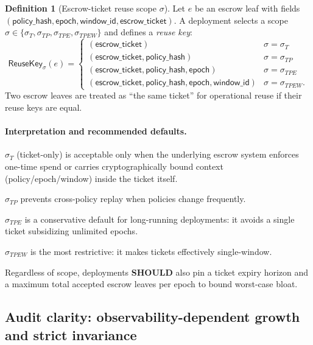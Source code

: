 \documentclass[11pt]{article}
\newcommand{\SHOULD}{\textbf{SHOULD}}
\newcommand{\1}{\mathbf{1}}
\theoremstyle{definition}
\newtheorem{definition}{Definition}
\theoremstyle{plain}
\begin{document}
\begin{definition}[Escrow-ticket reuse scope $\sigma$]
\label{def:escrow_scope}
Let $e$ be an escrow leaf with fields $(\textsf{policy\_hash},\textsf{epoch},\textsf{window\_id},\textsf{escrow\_ticket})$.
A deployment selects a scope $\sigma \in \{\sigma_T,\sigma_{TP},\sigma_{TPE},\sigma_{TPEW}\}$ and defines a \emph{reuse key}:
\[
\mathsf{ReuseKey}_\sigma(e)=
\begin{cases}
(\textsf{escrow\_ticket}) & \sigma=\sigma_T\\
(\textsf{escrow\_ticket},\textsf{policy\_hash}) & \sigma=\sigma_{TP}\\
(\textsf{escrow\_ticket},\textsf{policy\_hash},\textsf{epoch}) & \sigma=\sigma_{TPE}\\
(\textsf{escrow\_ticket},\textsf{policy\_hash},\textsf{epoch},\textsf{window\_id}) & \sigma=\sigma_{TPEW}.
\end{cases}
\]
Two escrow leaves are treated as ``the same ticket'' for operational reuse if their reuse keys are equal.
\end{definition}

\paragraph{Interpretation and recommended defaults.}
\begin{tightitemize}
\item $\sigma_T$ (ticket-only) is acceptable only when the underlying escrow system enforces one-time spend or carries cryptographically bound context (policy/epoch/window) inside the ticket itself.
\item $\sigma_{TP}$ prevents cross-policy replay when policies change frequently.
\item $\sigma_{TPE}$ is a conservative default for long-running deployments: it avoids a single ticket subsidizing unlimited epochs.
\item $\sigma_{TPEW}$ is the most restrictive: it makes tickets effectively single-window.
\end{tightitemize}
Regardless of scope, deployments \SHOULD{} also pin a ticket expiry horizon and a maximum total accepted escrow leaves per epoch to bound worst-case bloat.

\subsection{Audit clarity: observability-dependent growth and strict invariance}
\end{document}
